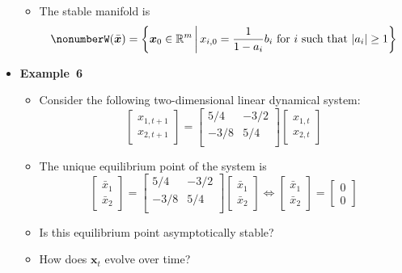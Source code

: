 \documentclass[12pt,a4paper]{article}
\begin{document}
\begin{itemize}
\begin{itemize}
  \item The stable manifold is
    \begin{equation}\nonumber%
      W(\bar{\bm{x}}) =
      \left\{ \bm{x}_{0} \in \R^{m}
        \,\bigg|\,
        \text{$x_{i,0} = \frac{1}{1-a_{i}}b_{i}$ for $i$ such that $|a_{i}|\geq 1$}
      \right\}
    \end{equation}
  \end{itemize}

\item \textbf{Example~6}
  \begin{itemize}
  \item Consider the following two-dimensional linear dynamical system:
    \begin{equation}\nonumber%
      \begin{bmatrix}
        x_{1,t+1} \\
        x_{2,t+1}
      \end{bmatrix}
      =
      \begin{bmatrix}
        5/4 & -3/2 \\
        -3/8 & 5/4 \\
      \end{bmatrix}
      \begin{bmatrix}
        x_{1,t} \\
        x_{2,t}
      \end{bmatrix}
    \end{equation}

  \item The unique equilibrium point of the system is
      \begin{equation}\nonumber%
        \begin{bmatrix}
        \bar{x}_{1} \\
        \bar{x}_{2}
        \end{bmatrix}
        =
        \begin{bmatrix}
          5/4 & -3/2 \\
          -3/8 & 5/4 \\
        \end{bmatrix}
        \begin{bmatrix}
          \bar{x}_{1} \\
          \bar{x}_{2}
        \end{bmatrix}
        \iff
        \begin{bmatrix}
          \bar{x}_{1} \\
          \bar{x}_{2}
        \end{bmatrix}
        =
        \begin{bmatrix}
          0 \\
          0
        \end{bmatrix}
      \end{equation}
    \item Is this equilibrium point asymptotically stable?
    \item How does $\bm{x}_{t}$ evolve over time?

  \end{itemize}

\end{itemize}
\end{document}
